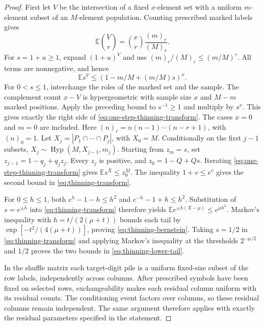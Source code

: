 \documentclass[11pt]{article}
\numberwithin{equation}{section}
\theoremstyle{definition}
\theoremstyle{remark}
\newcommand{\E}{\mathbb E}
\newcommand{\1}{\mathbf 1}
\begin{document}
\begin{proof}
First let $V$ be the intersection of a fixed $x$-element set with a
uniform $m$-element subset of an $M$-element population. Counting prescribed
marked labels gives
\[
 \E\binom Vr=\binom xr\frac{(m)_r}{(M)_r}.
\]
For $s=1+u\ge1$, expand $(1+u)^V$ and use
$(m)_r/(M)_r\le(m/M)^r$. All terms are nonnegative, and hence
\begin{equation}\label{eq:one-step-thinning-transform}
 \E s^V\le(1-m/M+(m/M)s)^x.
\end{equation}
For $0<s\le1$, interchange the roles of the marked set and the sample.
The complement count $x-V$ is hypergeometric with sample size $x$ and
$M-m$ marked positions. Apply the preceding bound to $s^{-1}\ge1$ and
multiply by $s^x$. This gives exactly the right side of
\eqref{eq:one-step-thinning-transform}. The cases $x=0$ and $m=0$ are
included. Here $(n)_r=n(n-1)\cdots(n-r+1)$, with $(n)_0=1$.
Let \(X_j=|P_1\cap\cdots\cap P_j|\), with \(X_0=M\).
Conditionally on the first \(j-1\) subsets,
\(X_j\sim\operatorname{Hyp}(M,X_{j-1},m_j)\).
Starting from \(z_m=s\), set
\(z_{j-1}=1-q_j+q_jz_j\). Every \(z_j\) is positive, and
\(z_0=1-Q+Qs\). Iterating \eqref{eq:one-step-thinning-transform}
gives \(\E s^X\le z_0^M\). The inequality \(1+v\le e^v\)
gives the second bound in \eqref{eq:thinning-transform}.

For \(0\le h\le1\), both
\(e^h-1-h\le h^2\) and \(e^{-h}-1+h\le h^2\).
Substitution of \(s=e^{\pm h}\) into
\eqref{eq:thinning-transform} therefore yields
\(\E e^{\pm h(X-\mu)}\le e^{\mu h^2}\).
Markov's inequality with \(h=t/(2(\mu+t))\) bounds each tail by
\(\exp[-t^2/(4(\mu+t))]\), proving
\eqref{eq:thinning-bernstein}.
Taking \(s=1/2\) in \eqref{eq:thinning-transform} and applying
Markov's inequality at the thresholds \(2^{-\mu/2}\) and \(1/2\)
proves the two bounds in \eqref{eq:thinning-lower-tail}.

In the shuffle matrix each target-digit pile is a uniform fixed-size
subset of the row labels, independently across columns. After prescribed
symbols have been fixed on selected rows, exchangeability makes each
residual column uniform with its residual counts. The conditioning event
factors over columns, so these residual columns remain independent.
The same argument therefore applies with exactly the residual parameters
specified in the statement.
\end{proof}
\end{document}
